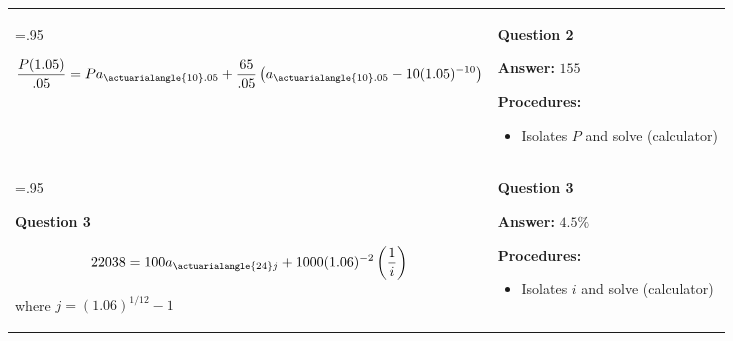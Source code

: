\documentclass[11pt]{article}
\begin{document}
\begin{tabularx}{\linewidth}{>{\hsize=.95\hsize}X >{\hsize=1.05\hsize}X}
\begin{tcolorbox}[height=5cm,valign=top]
\vspace{.5cm}
\begin{small}
\[
\frac{P(1.05)}{.05} = P a_{\actuarialangle{10}.05} + \frac{65}{.05}\left(a_{\actuarialangle{10}.05}-10(1.05)^{-10}\right)
\]
\end{small}


\vspace{.5cm}

\end{tcolorbox}
&
\begin{tcolorbox}[height=5cm,valign=top]
\textbf{Question 2}

\begin{center}
\textbf{Answer:} $155$
\end{center}

\textbf{Procedures:}
\begin{itemize} 
    \item Isolates $P$ and solve (calculator)
\end{itemize}
\end{tcolorbox}
\\[6pt]


\begin{tcolorbox}[height=5cm,valign=top]
\textbf{Question 3}

\vspace{.5cm}

\[
22038 = 100 a_{\actuarialangle{24}j} +1000(1.06)^{-2}\left(\frac{1}{i}\right)
\]

where $j = (1.06)^{1/12}-1$


\end{tcolorbox}
&
\begin{tcolorbox}[height=5cm,valign=top]
\textbf{Question 3}

\begin{center}
\textbf{Answer:} $4.5\%$
\end{center}

\textbf{Procedures:}
\begin{itemize} 
    \item Isolates $i$ and solve (calculator)
\end{itemize}
\end{tcolorbox}
\\[6pt]




\end{tabularx}
\end{document}
